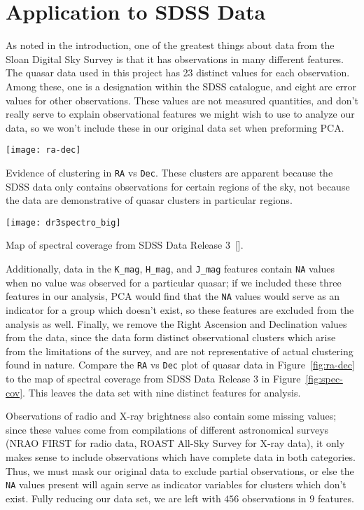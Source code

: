 \section{Application to SDSS Data}
As noted in the introduction, one of the greatest things about data from the Sloan Digital Sky Survey is that it has observations in many different features. The quasar data used in this project has 23 distinct values for each observation. Among these, one is a designation within the SDSS catalogue, and eight are error values for other observations. These values are not measured quantities, and don't really serve to explain observational features we might wish to use to analyze our data, so we won't include these in our original data set when preforming PCA.
\begin{marginfigure}
	\texttt{[image: ra-dec]}
	\caption{Evidence of clustering in \texttt{RA} vs \texttt{Dec}. These clusters are apparent because the SDSS data only contains observations for certain regions of the sky, not because the data are demonstrative of quasar clusters in particular regions.}
	\label{fig:ra-dec}
\end{marginfigure}
\begin{marginfigure}
	\texttt{[image: dr3spectro\_big]}
	\caption{Map of spectral coverage from SDSS Data Release 3~[\cite{sdssWebsite}].}
	\label{fig:spec-cov}
\end{marginfigure}
Additionally, data in the \texttt{K\_mag}, \texttt{H\_mag}, and \texttt{J\_mag} features contain \texttt{NA} values when no value was observed for a particular quasar; if we included these three features in our analysis, PCA would find that the \texttt{NA} values would serve as an indicator for a group which doesn't exist, so these features are excluded from the analysis as well. Finally, we remove the Right Ascension and Declination values from the data, since the data form distinct observational clusters which arise from the limitations of the survey, and are not representative of actual clustering found in nature. Compare the \texttt{RA} vs \texttt{Dec} plot of quasar data in Figure~\ref{fig:ra-dec} to the map of spectral coverage from SDSS Data Release 3 in Figure~\ref{fig:spec-cov}. This leaves the data set with nine distinct features for analysis.

Observations of radio and X-ray brightness also contain some missing values; since these values come from compilations of different astronomical surveys (NRAO FIRST for radio data, ROAST All-Sky Survey for X-ray data), it only makes sense to include observations which have complete data in both categories. Thus, we must mask our original data to exclude partial observations, or else the \texttt{NA} values present will again serve as indicator variables for clusters which don't exist. Fully reducing our data set, we are left with $456$ observations in $9$ features.

